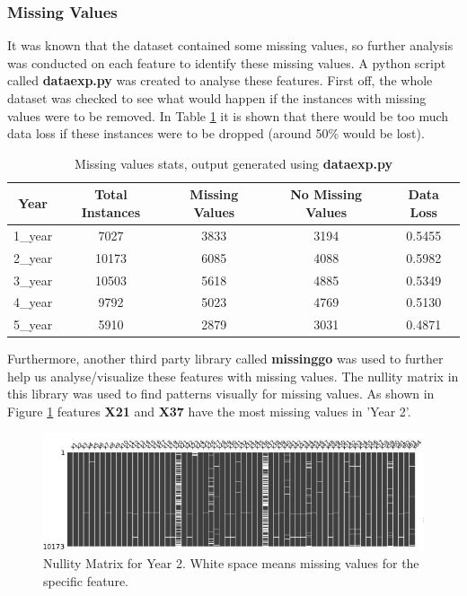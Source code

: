 \subsubsection{Missing Values}\label{sssec:missingvalues}
It was known that the dataset contained some missing values, so further analysis was conducted on each feature to identify these missing values. A python script called \textbf{dataexp.py} was created to analyse these features. First off, the whole dataset was checked to see what would happen if the instances with missing values were to be removed. In Table \ref{table:miss_val} it is shown that there would be too much data loss if these instances were to be dropped (around 50\% would be lost). 

\begin{table}[H]
\centering
\begin{tabular}{|c|c|c|c|c|}
\hline
\textbf{Year} & \textbf{Total Instances} & \textbf{Missing Values} & \textbf{No  Missing Values} & \textbf{Data Loss} \\ \hline
1\_year       & 7027                     & 3833                    & 3194                        & 0.5455             \\ \hline
2\_year       & 10173                    & 6085                    & 4088                        & 0.5982             \\ \hline
3\_year       & 10503                    & 5618                    & 4885                        & 0.5349             \\ \hline
4\_year       & 9792                     & 5023                    & 4769                        & 0.5130             \\ \hline
5\_year       & 5910                     & 2879                    & 3031                        & 0.4871             \\ \hline
\end{tabular}
\caption{Missing values stats, output generated using \textbf{dataexp.py}}
\label{table:miss_val}
\end{table}

\noindent Furthermore, another third party library called \textbf{missinggo} \cite{python:missinggo} was used to further help us analyse/visualize these features with missing values. The nullity matrix in this library was used to find patterns visually for missing values. As shown in Figure \ref{fig:nullity_matrix} features \textbf{X21} and \textbf{X37} have the most missing values in 'Year 2'. 

\begin{figure}[H]
\centering
  \includegraphics[scale = .78]{imgs/nullity_matrix.JPG}
  \caption{ Nullity Matrix for Year 2. White space means missing values for the specific feature. }
  \label{fig:nullity_matrix}
\end{figure}

